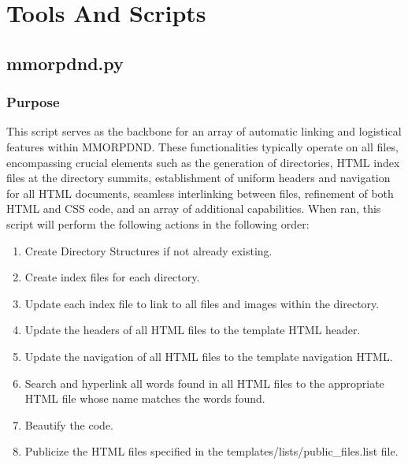 \chapter{Tools And Scripts}
\thispagestyle{fancy}  %


















\section{mmorpdnd.py}

\subsection{Purpose}

This script serves as the backbone for an array of automatic linking and logistical features within MMORPDND. These functionalities typically operate on all files, encompassing crucial elements such as the generation of directories, HTML index files at the directory summits, establishment of uniform headers and navigation for all HTML documents, seamless interlinking between files, refinement of both HTML and CSS code, and an array of additional capabilities. When ran, this script will perform the following actions in the following order:

\begin{enumerate}
	\item Create Directory Structures if not already existing.
	\item Create index files for each directory.
	\item Update each index file to link to all files and images within the directory.
	\item Update the headers of all HTML files to the template HTML header.
	\item Update the navigation of all HTML files to the template navigation HTML.
	\item Search and hyperlink all words found in all HTML files to the appropriate HTML file whose name matches the words found.
	\item Beautify the code.
	\item Publicize the HTML files specified in the templates/lists/public\_files.list file.
\end{enumerate}







